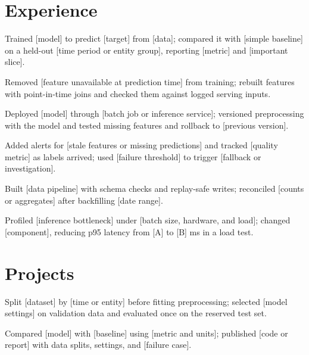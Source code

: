 \documentclass{resume}
\begin{document}

\section{Experience}

\begin{jobduties}
  \item Trained [model] to predict [target] from [data]; compared it with [simple baseline] on a held-out [time period or entity group], reporting [metric] and [important slice].
  \item Removed [feature unavailable at prediction time] from training; rebuilt features with point-in-time joins and checked them against logged serving inputs.
  \item Deployed [model] through [batch job or inference service]; versioned preprocessing with the model and tested missing features and rollback to [previous version].
  \item Added alerts for [stale features or missing predictions] and tracked [quality metric] as labels arrived; used [failure threshold] to trigger [fallback or investigation].
\end{jobduties}

\begin{jobduties}
  \item Built [data pipeline] with schema checks and replay-safe writes; reconciled [counts or aggregates] after backfilling [date range].
  \item Profiled [inference bottleneck] under [batch size, hardware, and load]; changed [component], reducing p95 latency from [A] to [B] ms in a load test.
\end{jobduties}

\section{Projects}

\begin{jobduties}
  \item Split [dataset] by [time or entity] before fitting preprocessing; selected [model settings] on validation data and evaluated once on the reserved test set.
  \item Compared [model] with [baseline] using [metric and units]; published [code or report] with data splits, settings, and [failure case].
\end{jobduties}
\end{document}
